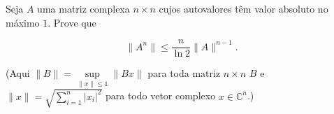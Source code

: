 Seja \(A\) uma matriz complexa \(n\times n\) cujos autovalores têm valor absoluto no máximo \(1\). Prove que 

\[
\|A^n\|\le \dfrac{n}{\ln 2} \|A\|^{n-1}.
\]

(Aqui \(\|B\|=\sup\limits_{\|x\|\leq 1} \|Bx\|\) para toda matriz \(n\times n\) \(B\) e \(\|x\|=\sqrt{\sum\limits_{i=1}^n |x_i|^2}\) para todo vetor complexo \(x\in\mathbb{C}^n\).)
